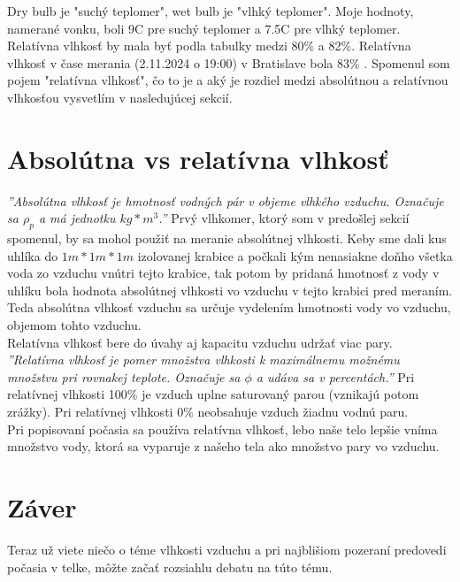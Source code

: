 \documentclass[11pt]{extarticle}
\begin{document}
Dry bulb je "suchý teplomer", wet bulb je "vlhký teplomer".
Moje hodnoty, namerané vonku, boli 9\textdegree C pre suchý teplomer a 7.5\textdegree C pre vlhký teplomer. Relatívna vlhkosť by mala byť podla tabulky medzi 80\% a 82\%. 
Relatívna vlhkosť v čase merania (2.11.2024 o 19:00) v Bratislave bola 83\% \cite{pocasie}.
Spomenul som pojem "relatívna vlhkosť", čo to je a aký je rozdiel medzi absolútnou a relatívnou vlhkosťou vysvetlím v nasledujúcej sekcií.
\section{Absolútna vs relatívna vlhkosť}
\textit{''Absolútna vlhkosť je hmotnosť vodných pár v objeme vlhkého vzduchu. Označuje sa $\rho_{p}$ a má jednotku $kg*m^3$.''} \cite{wiki-vlhkost}
Prvý vlhkomer, ktorý som v predošlej sekcií spomenul, by sa mohol použiť na meranie absolútnej vlhkosti. Keby sme dali kus uhlíka do $1m * 1m * 1m$ izolovanej krabice a počkali kým nenasiakne doňho všetka voda zo vzduchu vnútri tejto krabice, tak potom by pridaná hmotnosť z vody v uhlíku bola hodnota absolútnej vlhkosti vo vzduchu v tejto krabici pred meraním.\\
Teda absolútna vlhkosť vzduchu sa určuje vydelením hmotnosti vody vo vzduchu, objemom tohto vzduchu.\\

Relatívna vlhkosť bere do úvahy aj kapacitu vzduchu udržať viac pary.
\textit{''Relatívna vlhkosť je pomer množstva vlhkosti k maximálnemu možnému množstvu pri rovnakej teplote. Označuje sa $\phi$ a udáva sa v percentách.''} \cite{wiki-vlhkost}
Pri relatívnej vlhkosti 100\% je vzduch uplne saturovaný parou (vznikajú potom zrážky). Pri relatívnej vlhkosti 0\% neobsahuje vzduch žiadnu vodnú paru.
\\
Pri popisovaní počasia sa používa relatívna vlhkosť, lebo naše telo lepšie vníma množstvo vody, ktorá sa vyparuje z našeho tela ako množstvo pary vo vzduchu. \cite{quora}

\section{Záver}
Teraz už viete niečo o téme vlhkosti vzduchu a pri najblišiom pozeraní predovedi počasia v telke, môžte začať rozsiahlu debatu na túto tému.

\begin{thebibliography}{3}
\end{thebibliography}
\end{document}
